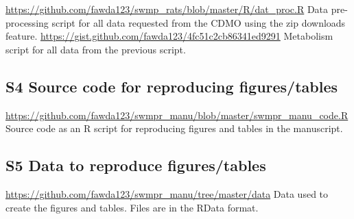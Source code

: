 \documentclass[10pt,letterpaper]{article}\usepackage[]{graphicx}\usepackage[]{color}
\begin{document}
\url{https://github.com/fawda123/swmp_rats/blob/master/R/dat_proc.R} Data pre-processing script for all data requested from the CDMO using the zip downloads feature.
\url{https://gist.github.com/fawda123/4fc51c2cb86341ed9291} Metabolism script for all data from the previous script.

\subsection*{S4 Source code for reproducing figures/tables}

\href{https://github.com/fawda123/swmpr_manu/blob/master/swmpr_manu_code.R}{https://github.com/fawda123/swmpr\_manu/blob/master/swmpr\_manu\_code.R} Source code as an R script for reproducing figures and tables in the manuscript.

\subsection*{S5 Data to reproduce figures/tables}

\href{https://github.com/fawda123/swmpr_manu/tree/master/data}{https://github.com/fawda123/swmpr\_manu/tree/master/data} Data used to create the figures and tables.  Files are in the RData format.
\end{document}
